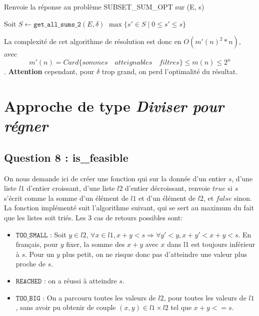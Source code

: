 \documentclass[10pt]{article}
\let\oldReturn\Return
\renewcommand{\Return}{\State\oldReturn}
\begin{document}
			\begin{algorithm}
				\caption{Renvoie la réponse au problème SUBSET\_SUM\_OPT sur (E, s)}
				\begin{algorithmic}[1]
						\State Soit $S \leftarrow \mathtt{get\_all\_sums\_2}(E, \delta)$
						\Return $\max\{s' \in S \mid 0 \leq s' \leq s\}$
					\EndFunction
				\end{algorithmic}
			\end{algorithm}
			La complexité de cet algorithme de résolution est donc en $\boxed{O(m'(n)^2 * n)}$,
			avec $$m'(n) = Card\{sommes \quad atteignables \quad filtres\} \leq m(n) \leq 2^n$$.
			\textbf{Attention} cependant, pour $\delta$ trop grand, on perd l'optimalité du résultat.

		\newpage
		\section{Approche de type \textit{Diviser pour régner}}\label{approche_naive}
			\subsection{Question 8 : is\_feasible}\label{is_feasible}
				On nous demande ici de créer une fonction qui sur la donnée d'un entier $s$, d'une liste $l1$ d'entier croissant,
				d'une liste $l2$ d'entier décroissant, renvoie $true$ si $s$ s'écrit comme la somme d'un élément de $l1$ et d'un
				élément de $l2$, et $false$ sinon.
				\newline
				La fonction implémenté suit l'algorithme suivant, qui se sert au maximum du fait que les listes soit triés.
				Les 3 cas de retours possibles sont:
				
				\begin{itemize}[label=-]
					\setlength\itemsep{0.1em}
					\item $\mathtt{TOO\_SMALL}$ : Soit $y \in l2$, $\forall x \in l1, x + y < s \Rightarrow \forall y' < y, x + y' < x + y < s$.
					En français, pour $y$ fixer, la somme des $x + y$ avec $x$ dans l1 est toujours inférieur à $s$.
					Pour un $y$ plus petit, on ne risque donc pas d'atteindre une valeur plus proche de $s$.
					\item $\mathtt{REACHED}$ : on a réussi à atteindre $s$.
					\item $\mathtt{TOO\_BIG}$ : On a parcouru toutes les valeurs de $l2$, pour toutes les valeurs de $l1$,
					sans avoir pu obtenir de couple $(x, y) \in l1 \times l2$ tel que $x + y <= s$.
				\end{itemize}
				
\end{document}
